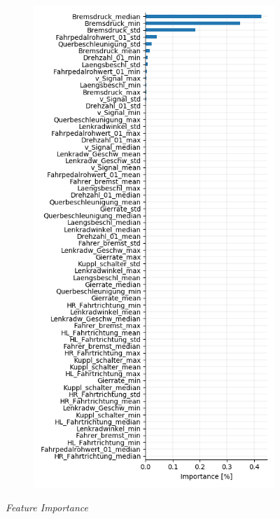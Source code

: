 \begin{figure}
\begin{subfigure}[c]{0.45\textwidth}
    \label{fig:feature_importance}
  \end{subfigure}
  \hfill
  \begin{subfigure}[c]{0.45\textwidth}
    \centering
    \includegraphics[width=\textwidth]{images/feature_perm_importance.png}
    \label{fig:feature_perm_importance}
  \end{subfigure}
  \caption{\textit{Feature Importance}}
\end{figure}

